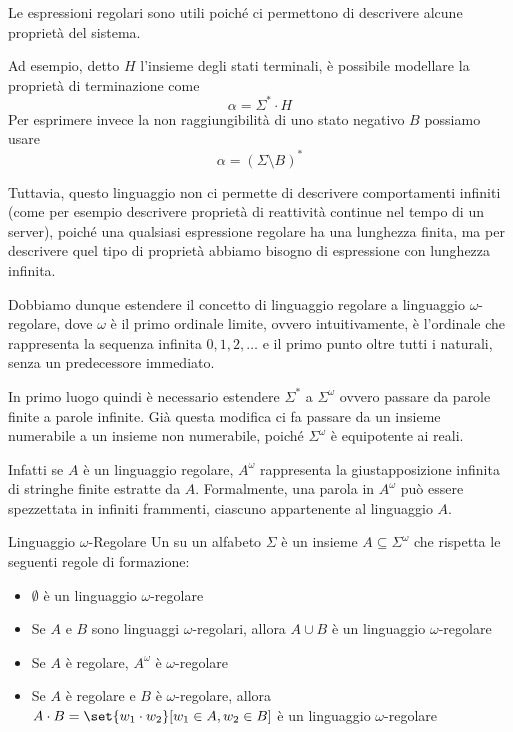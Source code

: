 Le espressioni regolari sono utili poiché ci permettono di descrivere alcune proprietà
del sistema.

Ad esempio, detto \(H\) l'insieme degli stati terminali, è possibile modellare la proprietà di terminazione come \[\alpha = \Sigma^* \cdot H\]
Per esprimere invece la non raggiungibilità di uno stato negativo \(B\) possiamo usare
\[\alpha = {(\Sigma \setminus B)}^* \]


Tuttavia, questo linguaggio non ci permette di descrivere comportamenti infiniti (come per esempio descrivere proprietà di reattività continue nel tempo di un server), poiché
una qualsiasi espressione regolare ha una lunghezza finita, ma per descrivere quel tipo di proprietà abbiamo bisogno di espressione con lunghezza infinita.

Dobbiamo dunque estendere il concetto di linguaggio regolare a linguaggio \(\omega\)-regolare, dove \(\omega\) è il primo ordinale limite, ovvero intuitivamente, è l'ordinale che rappresenta la sequenza infinita \(0,1,2,\ldots\) e il primo punto oltre tutti i naturali, senza un predecessore immediato.

In primo luogo quindi è necessario estendere \(\Sigma^*\) a \(\Sigma^\omega\) ovvero passare da parole finite a parole infinite. Già questa modifica ci fa passare da un insieme numerabile a un insieme non numerabile, poiché \(\Sigma^\omega\) è equipotente ai reali.

Infatti se \(A\) è un linguaggio regolare, \(A^\omega\) rappresenta la giustapposizione infinita di stringhe finite estratte da \(A\).
Formalmente, una parola in \(A^\omega\) può essere spezzettata in infiniti frammenti, ciascuno appartenente al linguaggio \(A\).

\begin{definition}{Linguaggio \(\omega\)-Regolare}
  Un  su un alfabeto \(\Sigma\) è un insieme \(A \subseteq \Sigma^\omega\) che rispetta le seguenti regole di formazione:
  \begin{itemize}
    \item \(\emptyset\) è un linguaggio \(\omega\)-regolare
    \item Se \(A\) e \(B\) sono linguaggi \(\omega\)-regolari, allora \(A \cup B\) è un linguaggio \(\omega\)-regolare
    \item Se \(A\) è regolare, \(A^\omega \) è \(\omega\)-regolare
    \item Se \(A\) è regolare e \(B\) è \(\omega\)-regolare, allora \(A \cdot B = \set{w_1 \cdot w_2}[w_1 \in A, w_2 \in B]\) è un linguaggio \(\omega\)-regolare
  \end{itemize}
\end{definition}


